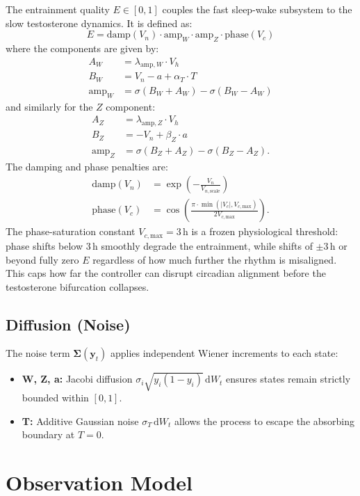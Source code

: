 \documentclass[11pt,a4paper]{article}
\begin{document}
The entrainment quality $E \in [0, 1]$ couples the fast sleep-wake subsystem to the slow testosterone dynamics. It is defined as:
\[
E = \text{damp}(V_n) \cdot \text{amp}_W \cdot \text{amp}_Z \cdot \text{phase}(V_c)
\]
where the components are given by:
\begin{align*}
A_W &= \lambda_{\text{amp},W} \cdot V_h \\
B_W &= V_n - a + \alpha_T \cdot T \\
\text{amp}_W &= \sigma(B_W + A_W) - \sigma(B_W - A_W)
\end{align*}
and similarly for the $Z$ component:
\begin{align*}
A_Z &= \lambda_{\text{amp},Z} \cdot V_h \\
B_Z &= -V_n + \beta_Z \cdot a \\
\text{amp}_Z &= \sigma(B_Z + A_Z) - \sigma(B_Z - A_Z).
\end{align*}
The damping and phase penalties are:
\begin{align*}
\text{damp}(V_n) &= \exp\left(-\frac{V_n}{V_{n,\text{scale}}}\right) \\
\text{phase}(V_c) &= \cos\left(\frac{\pi \cdot \min(|V_c|, V_{c,\text{max}})}{2 V_{c,\text{max}}}\right).
\end{align*}
The phase-saturation constant $V_{c,\text{max}} = 3$\,h is a frozen physiological threshold: phase shifts below 3\,h smoothly degrade the entrainment, while shifts of $\pm 3$\,h or beyond fully zero $E$ regardless of how much further the rhythm is misaligned. This caps how far the controller can disrupt circadian alignment before the testosterone bifurcation collapses.

\subsection{Diffusion (Noise)}
The noise term $\boldsymbol{\Sigma}(\mathbf{y}_t)$ applies independent Wiener increments to each state:
\begin{itemize}
    \item \textbf{W, Z, a:} Jacobi diffusion $\sigma_i \sqrt{y_i(1-y_i)} \, \mathrm{d}W_t$ ensures states remain strictly bounded within $[0, 1]$.
    \item \textbf{T:} Additive Gaussian noise $\sigma_T \, \mathrm{d}W_t$ allows the process to escape the absorbing boundary at $T=0$.
\end{itemize}

\section{Observation Model}
\end{document}
